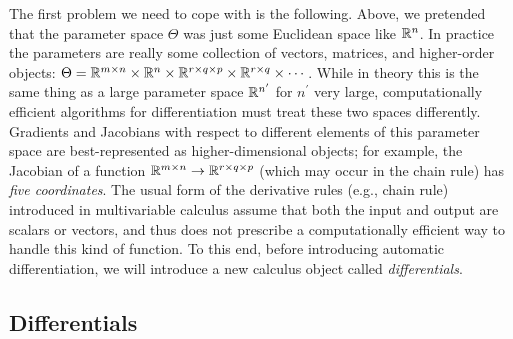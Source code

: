 \documentclass[../../book-main.tex]{subfiles}
\begin{document}
The first problem we need to cope with is the following. Above, we pretended that the parameter space \(\Theta\) was just some Euclidean space like \(\mathbb{R}^{n}\). In practice the parameters are really some collection of vectors, matrices, and higher-order objects: \(\Theta = \mathbb{R}^{m \times n} \times \mathbb{R}^{n} \times \mathbb{R}^{r \times q \times p} \times \mathbb{R}^{r \times q} \times \cdots\). While in theory this is the same thing as a large parameter space \(\mathbb{R}^{n^{\prime}}\) for \(n^{\prime}\) very large, computationally efficient algorithms for differentiation must treat these two spaces differently. Gradients and Jacobians with respect to different elements of this parameter space are best-represented as higher-dimensional objects; for example, the Jacobian of a function \(\mathbb{R}^{m \times n} \to \mathbb{R}^{r \times q \times p}\) (which may occur in the chain rule) has \textit{five coordinates}. The usual form of the derivative rules (e.g., chain rule) introduced in multivariable calculus assume that both the input and output are scalars or vectors, and thus does not prescribe a computationally efficient way to handle this kind of function. To this end, before introducing automatic differentiation, we will introduce a new calculus object called \textit{differentials}. 

\subsection{Differentials}
\end{document}
